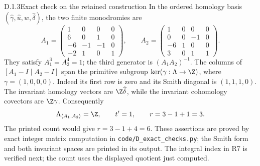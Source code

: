 
\begin{idstatement}{D.1.3}{Exact check on the retained construction}
\label{st:D.1.3}
In the ordered homology basis
$(\widehat\gamma,\widehat u,\widehat w,\widehat\delta)$,
the two finite monodromies are
\[
A_1=\begin{pmatrix}1&0&0&0\\6&0&1&0\\-6&-1&-1&0\\-2&1&0&1\end{pmatrix},
\qquad
A_2=\begin{pmatrix}1&0&0&0\\0&0&-1&0\\-6&1&0&0\\3&0&1&1\end{pmatrix}.
\]
They satisfy $A_1^3=A_2^4=1$; the third generator is
$(A_1A_2)^{-1}$. The columns of
$[A_1-I\mid A_2-I]$ span the primitive subgroup
$\ker(\gamma:\Lambda\to\Z)$, where $\gamma=(1,0,0,0)$.
Indeed its first row is zero and its Smith diagonal is $(1,1,1,0)$.
The invariant homology vectors are $\Z\widehat\delta$, while the
invariant cohomology covectors are $\Z\gamma$. Consequently
\[
\Lambda_{\langle A_1,A_2\rangle}=\Z,
\qquad t'=1,
\qquad r=3-1+1=3.
\]
The printed count would give $r=3-1+4=6$.
These assertions are proved by exact integer matrix computation in
\texttt{code/D\_exact\_checks.py}; the Smith form and both invariant
spaces are printed in its output. The integral index in R7 is
verified next; the count uses the displayed quotient just computed.
\end{idstatement}



